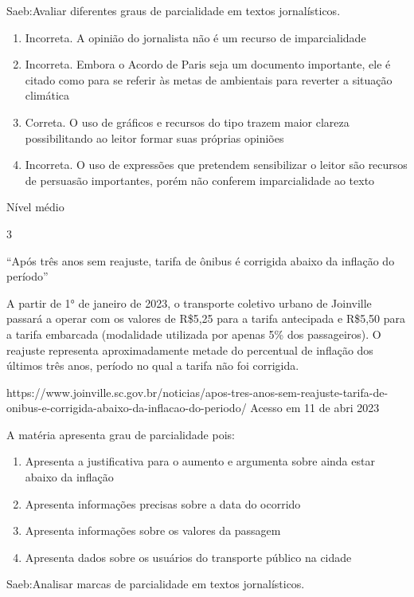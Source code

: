 {Saeb:Avaliar diferentes graus de parcialidade em textos jornalísticos.

\begin{enumerate}
\def\labelenumi{\arabic{enumi}.}
\item
  Incorreta. A opinião do jornalista não é um recurso de imparcialidade
\item
  Incorreta. Embora o Acordo de Paris seja um documento importante, ele
  é citado como para se referir às metas de ambientais para reverter a
  situação climática
\item
  Correta. O uso de gráficos e recursos do tipo trazem maior clareza
  possibilitando ao leitor formar suas próprias opiniões
\item
  Incorreta. O uso de expressões que pretendem sensibilizar o leitor são
  recursos de persuasão importantes, porém não conferem imparcialidade
  ao texto
\end{enumerate}

Nível médio

\num{3}

``Após três anos sem reajuste, tarifa de ônibus é corrigida abaixo da
inflação do período''

A partir de 1° de janeiro de 2023, o transporte coletivo urbano de
Joinville passará a operar com os valores de R\$5,25 para a tarifa
antecipada e R\$5,50 para a tarifa embarcada (modalidade utilizada por
apenas 5\% dos passageiros). O reajuste representa aproximadamente
metade do percentual de inflação dos últimos três anos, período no qual
a tarifa não foi corrigida.

https://www.joinville.sc.gov.br/noticias/apos-tres-anos-sem-reajuste-tarifa-de-onibus-e-corrigida-abaixo-da-inflacao-do-periodo/
Acesso em 11 de abri 2023

A matéria apresenta grau de parcialidade pois:

\begin{enumerate}
\def\labelenumi{\alph{enumi})}
\item
  Apresenta a justificativa para o aumento e argumenta sobre ainda estar
  abaixo da inflação
\item
  Apresenta informações precisas sobre a data do ocorrido
\item
  Apresenta informações sobre os valores da passagem
\item
  Apresenta dados sobre os usuários do transporte público na cidade
\end{enumerate}

Saeb:Analisar marcas de parcialidade em textos jornalísticos.

}
